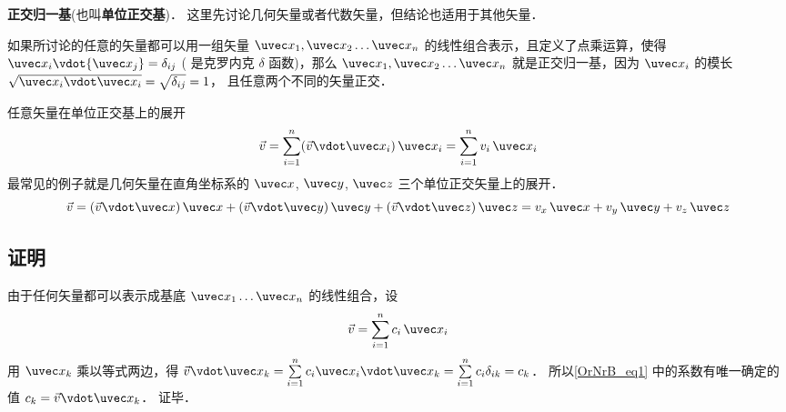 \textbf{正交归一基}(也叫\textbf{单位正交基})．
这里先讨论几何矢量或者代数矢量，但结论也适用于其他矢量．

如果所讨论的任意的矢量都可以用一组矢量 $\uvec x_1,\uvec x_2\dots\uvec x_n$ 的线性组合表示，且定义了点乘运算，使得 ${\uvec x_i}\vdot{\uvec x_j} = {\delta _{ij}}$ ( 是克罗内克 $\delta$ 函数)，那么 ${\uvec x_1},{\uvec x_2}\dots{\uvec x_n}$ 就是正交归一基，因为 $\uvec x_i$ 的模长 $\sqrt{\uvec x_i \vdot \uvec x_i} = \sqrt{\delta _{ij}}= 1$， 且任意两个不同的矢量正交．

任意矢量在单位正交基上的展开
 \begin{equation}
\vec v = \sum\limits_{i = 1}^n (\vec v\vdot\uvec x_i)\,\uvec x_i = \sum\limits_{i = 1}^n v_i \,\uvec x_i
\end{equation}
最常见的例子就是几何矢量在直角坐标系的 $\uvec x$, $\uvec y$, $\uvec z$ 三个单位正交矢量上的展开．
 \begin{equation}
\vec v = (\vec v \vdot \uvec x)\,\uvec x + (\vec v \vdot \uvec y)\,\uvec y + (\vec v \vdot \uvec z)\,\uvec z = v_x \,\uvec x + v_y \,\uvec y + v_z \,\uvec z
\end{equation} 

\subsection{证明}
由于任何矢量都可以表示成基底 ${\uvec x_1}\dots{\uvec x_n}$ 的线性组合，设
\begin{equation}\label{OrNrB_eq1}
\vec v = \sum\limits_{i = 1}^n {{c_i}{{\,\uvec x}_i}} 
\end{equation} 
用 ${\uvec x_k}$ 乘以等式两边，得 $\vec v{\vdot\uvec x_k} = \sum\limits_{i = 1}^n {{c_i}{{\uvec x}_i}{{\vdot\uvec x}_k}}  = \sum\limits_{i = 1}^n {{c_i}{\delta _{ik}}}  = {c_k}$． 所以\autoref{OrNrB_eq1} 中的系数有唯一确定的值 ${c_k} = \vec v{\vdot\uvec x_k}$． 证毕．






